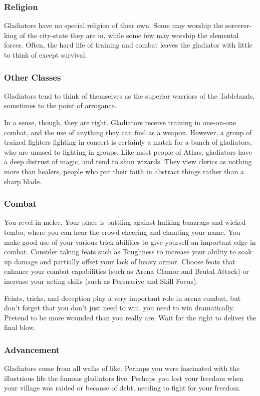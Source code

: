 \subsubsection{Religion}
Gladiators have no special religion of their own. Some may worship the sorcerer-king of the city-state they are in, while some few may worship the elemental forces. Often, the hard life of training and combat leaves the gladiator with little to think of except survival.

\subsubsection{Other Classes}
Gladiators tend to think of themselves as the superior warriors of the Tablelands, sometimes to the point of arrogance.

In a sense, though, they are right. Gladiators receive training in one-on-one combat, and the use of anything they can find as a weapon. However, a group of trained fighters fighting in concert is certainly a match for a bunch of gladiators, who are unused to fighting in groups. Like most people of Athas, gladiators have a deep distrust of magic, and tend to shun wizards. They view clerics as nothing more than healers, people who put their faith in abstract things rather than a sharp blade.

\subsubsection{Combat}
You revel in melee. Your place is battling against hulking baazrags and wicked tembo, where you can hear the crowd cheering and chanting your name. You make good use of your various trick abilities to give yourself an important edge in combat. Consider taking feats such as Toughness to increase your ability to soak up damage and partially offset your lack of heavy armor. Choose feats that enhance your combat capabilities (such as Arena Clamor and Brutal Attack) or increase your acting skills (such as Persuasive and Skill Focus).

Feints, tricks, and deception play a very important role in arena combat, but don't forget that you don't just need to win, you need to win dramatically. Pretend to be more wounded than you really are. Wait for the right to deliver the final blow.

\subsubsection{Advancement}
Gladiators come from all walks of like. Perhaps you were fascinated with the illustrious life the famous gladiators live. Perhaps you lost your freedom when your village was raided or because of debt, needing to fight for your freedom.

